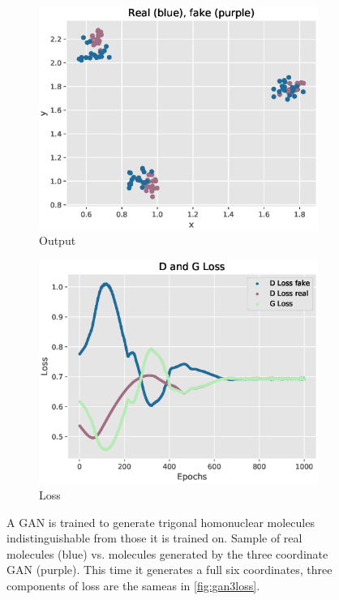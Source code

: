 \documentclass[12pt,a4paper]{article}
\begin{document}
\begin{figure}[h!]
\centering
\begin{subfigure}[t]{0.49\textwidth}
    \includegraphics[width = \linewidth]{images/gan6.eps}
    \caption{Output}
    \label{fig:gan6mols}
\end{subfigure}
\begin{subfigure}[t]{0.49\textwidth}
    \includegraphics[width = \linewidth]{images/gan6loss.eps}
    \caption{Loss}
    \label{fig:gan6loss}
\end{subfigure}
\caption{A GAN is trained to generate trigonal homonuclear molecules indistinguishable from those it is trained on.  Sample of real molecules (\textcolor{blu2}{blue}) vs. molecules generated by the three coordinate GAN (\textcolor{plumb}{purple}). This time it generates a full six coordinates, three components of loss are the sameas in \ref{fig:gan3loss}.}
\label{fig:gan6}
\end{figure}
\end{document}
